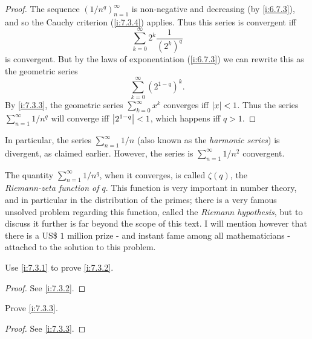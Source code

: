 \begin{proof}
  The sequence \((1 / n^q)_{n = 1}^\infty\) is non-negative and decreasing (by \cref{i:6.7.3}), and so the Cauchy criterion (\cref{i:7.3.4}) applies.
  Thus this series is convergent iff
  \[
    \sum_{k = 0}^\infty 2^k \dfrac{1}{(2^k)^q}
  \]
  is convergent.
  But by the laws of exponentiation (\cref{i:6.7.3}) we can rewrite this as the geometric series
  \[
    \sum_{k = 0}^\infty (2^{1 - q})^k.
  \]
  By \cref{i:7.3.3}, the geometric series \(\sum_{k = 0}^\infty x^k\) converges iff \(\left\lvert x\right\rvert < 1\).
  Thus the series \(\sum_{n = 1}^\infty 1 / n^q\) will converge iff \(\left\lvert2^{1 - q}\right\rvert < 1\), which happens iff \(q > 1\).
\end{proof}

\begin{note}
  In particular, the series \(\sum_{n = 1}^\infty 1 / n\) (also known as the \emph{harmonic series}) is divergent, as claimed earlier.
  However, the series is \(\sum_{n = 1}^\infty 1 / n^2\) convergent.
\end{note}

\begin{rmk}\label{i:7.3.8}
  The quantity \(\sum_{n = 1}^\infty 1 / n^q\), when it converges, is called \(\zeta(q)\), the \\
  \emph{Riemann-zeta function of \(q\)}.
  This function is very important in number theory, and in particular in the distribution of the primes;
  there is a very famous unsolved problem regarding this function, called the \emph{Riemann hypothesis}, but to discuss it further is far beyond the scope of this text.
  I will mention however that there is a US\$ \(1\) million prize
  - and instant fame among all mathematicians -
  attached to the solution to this problem.
\end{rmk}

\exercisesection

\begin{ex}\label{i:ex:7.3.1}
  Use \cref{i:7.3.1} to prove \cref{i:7.3.2}.
\end{ex}

\begin{proof}
  See \cref{i:7.3.2}.
\end{proof}

\begin{ex}\label{i:ex:7.3.2}
  Prove \cref{i:7.3.3}.
\end{ex}

\begin{proof}
  See \cref{i:7.3.3}.
\end{proof}

